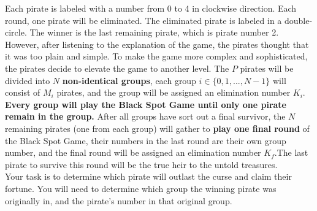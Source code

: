 \documentclass[12pt,a4paper]{article}
\begin{document}
\begin{center}
\end{center}

\noindent
Each pirate is labeled with a number from 0 to 4 in clockwise direction. Each round, one pirate will be eliminated. 
The eliminated pirate is labeled in a double-circle. The winner is the last remaining pirate, which is pirate number 2.\\

\noindent
However, after listening to the explanation of the game, the pirates thought that it was too plain and simple.
To make the game more complex and sophisticated, the pirates decide to elevate the game to another level. The \(P\) pirates will be divided into \(N\) \textbf{non-identical groups}, 
each group \(i \in \{0, 1, ..., N-1\}\) will consist of \(M_i\) pirates, and the group will be assigned an elimination number \(K_i\).
\textbf{Every group will play the Black Spot Game until only one pirate remain in the group.} After all groups have sort out a final survivor,
the \(N\) remaining pirates (one from each group) will gather to \textbf{play one final round} of the Black Spot Game, their numbers in the last round are their own group number, and the final round will be assigned an elimination number \(K_f\).The last pirate to survive this round will be the true heir to the untold treasures.\\

\noindent
Your task is to determine which pirate will outlast the curse and claim their fortune.
You will need to determine which group the winning pirate was originally in, and the pirate's number in that original group. 
\end{document}
